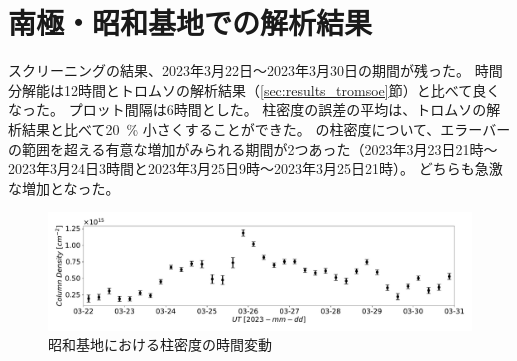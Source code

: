 \section{南極・昭和基地での解析結果}
\label{sec:results_syowa}
スクリーニングの結果、2023年3月22日〜2023年3月30日の期間が残った。
時間分解能は12時間とトロムソの解析結果（\ref{sec:results_tromsoe}節）と比べて良くなった。
プロット間隔は6時間とした。
柱密度の誤差の平均は、トロムソの解析結果と比べて20\ \% 小さくすることができた。
の柱密度について、エラーバーの範囲を超える有意な増加がみられる期間が2つあった（2023年3月23日21時〜2023年3月24日3時間と2023年3月25日9時〜2023年3月25日21時）。
どちらも急激な増加となった。
\begin{figure}[htbp]
    \centering
    \includegraphics[width=\linewidth]{master_thesis_contents/master_thesis_fig/column_density_spectr6_syowa.pdf}
    \caption{昭和基地における柱密度の時間変動}
    \label{fig:column_density_spectr6_syowa}
\end{figure}
